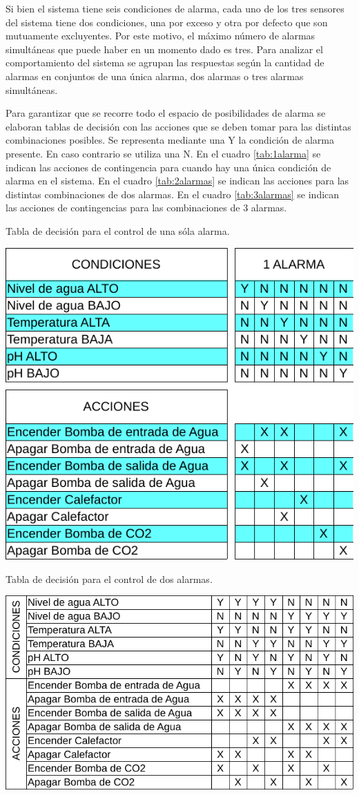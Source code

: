 Si bien el sistema tiene seis condiciones de alarma, cada uno de los tres sensores del sistema tiene dos condiciones, una por exceso y otra por defecto que son mutuamente excluyentes.  Por este motivo, el máximo número de alarmas simultáneas que puede haber en un momento dado es tres. Para analizar el comportamiento del sistema se agrupan las respuestas según la cantidad de alarmas en conjuntos de una única alarma, dos alarmas o tres alarmas simultáneas.

Para garantizar que se recorre todo el espacio de posibilidades de alarma se elaboran tablas de decisión con las acciones que se deben tomar para las distintas combinaciones posibles.  Se representa mediante una Y la condición de alarma presente.  En caso contrario se utiliza una N. En el cuadro \ref{tab:1alarma} se indican las acciones de contingencia para cuando hay una única condición de alarma en el sistema.  En el cuadro \ref{tab:2alarmas} se indican las acciones para las distintas combinaciones de dos alarmas. En el cuadro \ref{tab:3alarmas} se indican las acciones de contingencias para las combinaciones de 3 alarmas.

\begin{table}[p]
	\centering
	\caption{Tabla de decisión para el control de una sóla alarma.}
    \includegraphics[width=.55\textwidth]{./Figures/tabla1alarma.pdf}
	\label{tab:1alarma}
\end{table}

\begin{table}[htbp]
\centering
\caption{Tabla de decisión para el control de dos alarmas.}
\includegraphics[width=.75\textwidth]{./Figures/tabla2alarmas-alternativo2.pdf}
\label{tab:2alarmas}
\end{table}




